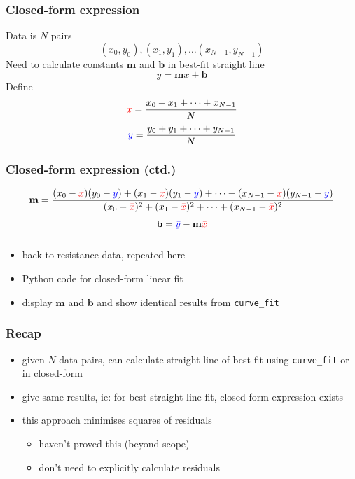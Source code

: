 \documentclass[english,14pt]{beamer}
\newcommand\red[1]{{\color{red} #1}}
\newcommand\blue[1]{{\color{blue} #1}}
\begin{document}
\begin{frame}[fragile]

\frametitle{Closed-form expression}

Data is $N$ pairs
\[
(x_0,y_0), (x_1,y_1), \ldots (x_{N-1},y_{N-1})
\]
Need to calculate constants $\mathbf{m}$ and $\mathbf{b}$ in best-fit straight line
\[
\boxed{
y = \mathbf{m}x + \mathbf{b}}
\]
Define
\[
\red{\bar{x}} = \frac{x_0 + x_1 + \cdots + x_{N-1}}{N}
\]
\[
\blue{\bar{y}} = \frac{y_0 + y_1 + \cdots + y_{N-1}}{N}
\]

\end{frame}


\begin{frame}[fragile]

\frametitle{Closed-form expression (ctd.)}

\footnotesize{
\[
\mathbf{m} = \frac{(x_0-\red{\bar{x}})(y_0-\blue{\bar{y}} ) + (x_1-\red{\bar{x}})(y_1-\blue{\bar{y}} ) + \cdots + (x_{N-1}-\red{\bar{x}})(y_{N-1}-\blue{\bar{y}} )}{(x_0-\red{\bar{x}})^2 + (x_1-\red{\bar{x}})^2 + \cdots + (x_{N-1}-\red{\bar{x}})^2}
\]
\[
\mathbf{b} = \blue{\bar{y}} - \mathbf{m} \red{\bar{x}}
\]
}

\end{frame}


\begin{frame}[fragile]

\frametitle{}

\begin{itemize}
	\item back to resistance data, repeated here
	\item Python code for closed-form linear fit
	\item display $\mathbf{m}$ and $\mathbf{b}$ and show identical results from \texttt{curve\_fit}
\end{itemize}

\end{frame}


\begin{frame}[fragile]

\frametitle{Recap}

\begin{itemize}
	\item given $N$ data pairs, can calculate straight line of best fit using \texttt{curve\_fit} or in closed-form
	\item give same results, ie: for best straight-line fit, closed-form expression exists
	\item this approach minimises squares of residuals
	\begin{itemize}
		\item haven't proved this (beyond scope)
		\item don't need to explicitly calculate residuals
	\end{itemize}	
\end{itemize}

\end{frame}
\end{document}

